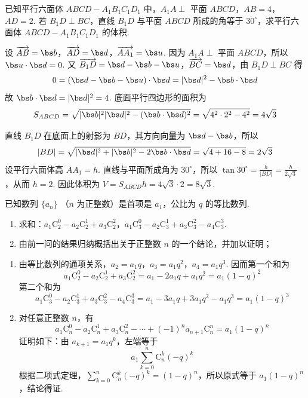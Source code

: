 \begin{problem}
已知平行六面体 \(ABCD - A_{1}B_{1}C_{1}D_{1}\) 中，\(A_{1}A \perp\) 平面 \(ABCD\)，\(AB = 4\)，\(AD = 2\). 若 \(B_{1}D \perp BC\)，直线 \(B_{1}D\) 与平面 \(ABCD\) 所成的角等于 \(30^{\circ}\)，求平行六面体 \(ABCD - A_{1}B_{1}C_{1}D_{1}\) 的体积.

\end{problem}

\begin{solution}
设 \(\overrightarrow{AB}=\bs b\)，\(\overrightarrow{AD}=\bs d\)，\(\overrightarrow{AA_1}=\bs u\). 因为 \(A_1A\perp\) 平面 \(ABCD\)，所以 \(\bs u\cdot\bs d=0\). 又 \(\overrightarrow{B_1D}=\bs d-\bs b-\bs u\)，\(\overrightarrow{BC}=\bs d\)，由 \(B_1D\perp BC\) 得
\[
0=(\bs d-\bs b-\bs u)\cdot\bs d=|\bs d|^{2}-\bs b\cdot\bs d
\]
故 \(\bs b\cdot\bs d=|\bs d|^{2}=4\). 底面平行四边形的面积为
\[
S_{ABCD}=\sqrt{|\bs b|^{2}|\bs d|^{2}-(\bs b\cdot\bs d)^{2}}=\sqrt{4^{2}\cdot2^{2}-4^{2}}=4\sqrt3
\]

直线 \(B_1D\) 在底面上的射影为 \(BD\)，其方向向量为 \(\bs d-\bs b\)，所以
\[
|BD|=\sqrt{|\bs d|^{2}+|\bs b|^{2}-2\bs b\cdot\bs d}=\sqrt{4+16-8}=2\sqrt3
\]
设平行六面体高 \(AA_1=h\). 直线与平面所成角为 \(30^{\circ}\)，所以 \(\tan30^{\circ}=\frac{h}{|BD|}=\frac{h}{2\sqrt3}\)，从而 \(h=2\). 因此体积为 \(V=S_{ABCD}h=4\sqrt3\cdot2=8\sqrt3\).
\end{solution}

\begin{problem}
已知数列 \(\{a_{n}\}\) （\(n\) 为正整数）是首项是 \(a_{1}\)，公比为 \(q\) 的等比数列.

\begin{enumerate}
\item 求和：\(a_{1}\mathrm C_{2}^{0} - a_{2}\mathrm C_{2}^{1} + a_{3}\mathrm C_{2}^{2}\)，\(a_{1}\mathrm C_{3}^{0} - a_{2}\mathrm C_{3}^{1} + a_{3}\mathrm C_{3}^{2} - a_{4}\mathrm C_{3}^{3}\).
\item 由前一问的结果归纳概括出关于正整数 \(n\) 的一个结论，并加以证明；
\end{enumerate}
\end{problem}

\begin{solution}
\begin{enumerate}
\item 由等比数列的通项关系，\(a_2=a_1q\)，\(a_3=a_1q^2\)，\(a_4=a_1q^3\). 因而第一个和为
\[
a_1\mathrm C_2^0-a_2\mathrm C_2^1+a_3\mathrm C_2^2=a_1-2a_1q+a_1q^2=a_1(1-q)^2
\]
第二个和为
\[
a_1\mathrm C_3^0-a_2\mathrm C_3^1+a_3\mathrm C_3^2-a_4\mathrm C_3^3=a_1-3a_1q+3a_1q^2-a_1q^3=a_1(1-q)^3
\]
\item 对任意正整数 \(n\)，有
\[
a_1\mathrm C_n^0-a_2\mathrm C_n^1+a_3\mathrm C_n^2-\cdots+(-1)^na_{n+1}\mathrm C_n^n=a_1(1-q)^n
\]
证明如下：由 \(a_{k+1}=a_1q^k\)，左端等于
\[
a_1\sum_{k=0}^{n}\mathrm C_n^k(-q)^k
\]
根据二项式定理，\(\sum_{k=0}^{n}\mathrm C_n^k(-q)^k=(1-q)^n\)，所以原式等于 \(a_1(1-q)^n\)，结论得证.
\end{enumerate}
\end{solution}

